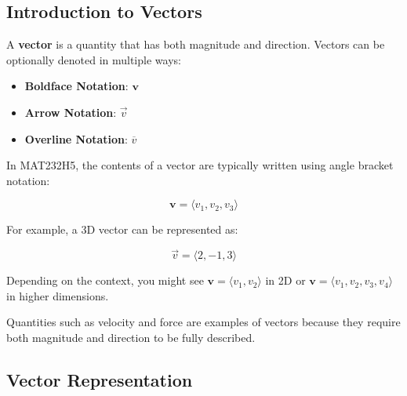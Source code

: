 \documentclass{article}
\begin{document}
\renewcommand{\familydefault}{\rmdefault}



\setcounter{page}{0}
\newpage
\tableofcontents
\newpage



\subsection*{Introduction to Vectors}

\begin{definitionbox}
    A \textbf{vector} is a quantity that has both magnitude and direction. Vectors can be optionally denoted in multiple ways:  

    \begin{itemize}
        \item \textbf{Boldface Notation}: \(\mathbf{v}\)  
        \item \textbf{Arrow Notation}: \(\vec{v}\)  
        \item \textbf{Overline Notation}: \(\overline{v}\)
    \end{itemize}  
    
    \begin{notebox}
    In MAT232H5, the contents of a vector are typically written using angle bracket notation:  
    
    \[
    \mathbf{v} = \langle v_1, v_2, v_3 \rangle
    \]
    
    For example, a 3D vector can be represented as:  
    
    \[
    \vec{v} = \langle 2, -1, 3 \rangle
    \]
    
    Depending on the context, you might see \(\mathbf{v} = \langle v_1, v_2 \rangle\) in 2D or \(\mathbf{v} = \langle v_1, v_2, v_3, v_4 \rangle\) in higher dimensions.
    \end{notebox}  
\end{definitionbox}

\begin{remarkbox} Quantities such as velocity and force are examples of vectors because they require both magnitude and direction to be fully described.
\end{remarkbox}

\subsection*{Vector Representation}
\end{document}
